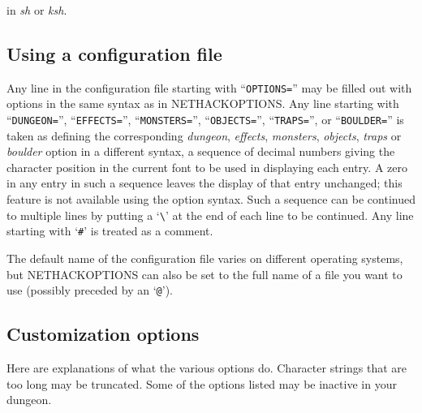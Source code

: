 \nd in {\it sh\/} or {\it ksh}.

\subsection*{Using a configuration file}

Any line in the configuration file starting with ``{\tt OPTIONS=}'' may be
filled out with options in the same syntax as in NETHACKOPTIONS.
Any line starting with ``{\tt DUNGEON=}'', ``{\tt EFFECTS=}'',
``{\tt MONSTERS=}'', ``{\tt OBJECTS=}'', ``{\tt TRAPS=}'', 
or ``{\tt BOULDER=}''
is taken as defining the corresponding {\it dungeon},
{\it effects}, {\it monsters}, {\it objects}, {\it traps\/} or
{\it boulder\/} option in a different syntax,
a sequence of decimal numbers giving the character position
in the current font to be used in displaying each entry.
A zero in any entry in such a sequence leaves the display of that
entry unchanged; this feature is not available using the option syntax.
Such a sequence can be continued to multiple lines by putting a
`{\tt \verb+\+}' at the end of each line to be continued.
Any line starting with `{\tt \#}' is treated as a comment.

The default name of the configuration file varies on different
operating systems, but NETHACKOPTIONS can also be set to
the full name of a file you want to use (possibly preceded by an `{\tt @}').

\subsection*{Customization options}

Here are explanations of what the various options do.
Character strings that are too long may be truncated.
Some of the options listed may be inactive in your dungeon.

